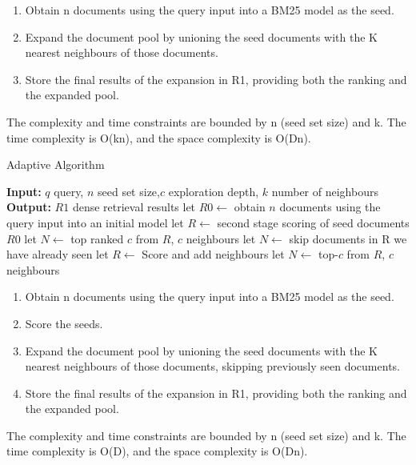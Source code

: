 \documentclass[sigconf,authorversion,nonacm]{acmart}
\begin{document}
\begin{enumerate}
	\item Obtain n documents using the query input into a BM25 model as the seed.
	\item Expand the document pool by unioning the seed documents with the K nearest neighbours of those documents.
	\item Store the final results of the expansion in R1, providing both the ranking and the expanded pool.
\end{enumerate}
The complexity and time constraints are bounded by n (seed set size) and k. The time complexity is
O(kn), and the space complexity is O(Dn).


\begin{algorithm}
	\caption{Adaptive Algorithm}
	\begin{algorithmic}[1]
		\STATE \textbf{Input:} \( q \) query, \( n \) seed set size,\( c \) exploration depth, \( k
		\) number of neighbours
		\STATE \textbf{Output:} \( R1 \) dense retrieval results
		\STATE let \( R0 \leftarrow \) obtain \( n \) documents using the query input into an initial model
		\STATE let \( R \leftarrow \) second stage scoring of seed documents \(R0\)
		\STATE let \( N \leftarrow\) top ranked \( c  \) from \(R \), \(c \) neighbours
		\STATE let \( N \leftarrow\) skip documents in R we have already seen
		\STATE let \( R \leftarrow \) Score and add neighbours
		\STATE let \( N \leftarrow\) top-\( c  \) from \(R \), \(c \) neighbours
		\ENDWHILE
	\end{algorithmic}
\end{algorithm}

\begin{enumerate}

	\item Obtain n documents using the query input into a BM25 model as the seed.

	\item Score the seeds.

	\item Expand the document pool by unioning the seed documents with the K nearest neighbours of
	      those documents, skipping previously seen documents.

	\item Store the final results of the expansion in R1, providing both the ranking and the
	      expanded pool.

\end{enumerate}

The complexity and time constraints are bounded by n (seed set size) and k. The time complexity is
O(D), and the space complexity is O(Dn).
\end{document}
